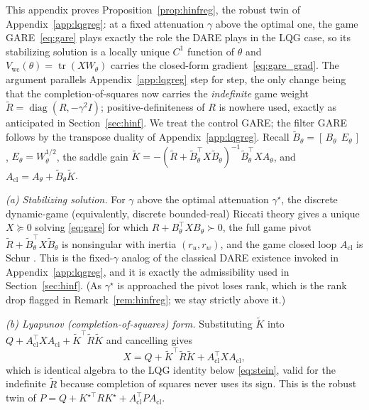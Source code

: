 \documentclass[twocolumn,amsthm]{autart}
\begin{document}
This appendix proves Proposition~\ref{prop:hinfreg}, the robust twin of
Appendix~\ref{app:lqgreg}: at a fixed attenuation $\gamma$ above the optimal
one, the game GARE~\eqref{eq:gare} plays exactly the role the DARE plays in the
LQG case, so its stabilizing solution is a locally unique $C^1$ function of
$\theta$ and $V_{\mathrm{wc}}(\theta)=\operatorname{tr}(XW_\theta)$ carries the
closed-form gradient~\eqref{eq:gare_grad}. The argument parallels
Appendix~\ref{app:lqgreg} step for step, the only change being that the
completion-of-squares now carries the \emph{indefinite} game weight
$\tilde R=\operatorname{diag}(R,-\gamma^2 I)$; positive-definiteness of $R$ is
nowhere used, exactly as anticipated in Section~\ref{sec:hinf}. We treat the
control GARE; the filter GARE follows by the transpose duality of
Appendix~\ref{app:lqgreg}. Recall $\tilde B_\theta=[\,B_\theta\ \ E_\theta\,]$,
$E_\theta=W_\theta^{1/2}$, the saddle gain
$\tilde K=-(\tilde R+\tilde B_\theta^\top X\tilde B_\theta)^{-1}
\tilde B_\theta^\top X A_\theta$, and $A_{\mathrm{cl}}=A_\theta+\tilde B_\theta\tilde K$.

\emph{(a) Stabilizing solution.} For $\gamma$ above the optimal attenuation
$\gamma^\star$, the discrete dynamic-game (equivalently, discrete bounded-real)
Riccati theory gives a unique $X\succeq0$ solving \eqref{eq:gare} for which
$R+B_\theta^\top XB_\theta\succ0$, the full game pivot $\tilde R+\tilde
B_\theta^\top X\tilde B_\theta$ is nonsingular with inertia $(r_u,r_w)$, and the
game closed loop $A_{\mathrm{cl}}$ is Schur \cite{basar1995dynamic,boyd1994linear}.
This is the fixed-$\gamma$ analog of the classical DARE existence invoked in
Appendix~\ref{app:lqgreg}, and it is exactly the admissibility used in
Section~\ref{sec:hinf}. (As $\gamma^\star$ is approached the pivot loses rank,
which is the rank drop flagged in Remark~\ref{rem:hinfreg}; we stay strictly above
it.)

\emph{(b) Lyapunov (completion-of-squares) form.} Substituting
$\tilde K$ into $Q+A_{\mathrm{cl}}^\top XA_{\mathrm{cl}}+\tilde K^\top\tilde
R\tilde K$ and cancelling gives
\begin{equation}\label{eq:gare-lyap}
X=Q+\tilde K^\top\tilde R\tilde K+A_{\mathrm{cl}}^\top XA_{\mathrm{cl}},
\end{equation}
which is identical algebra to the LQG identity below \eqref{eq:stein}, valid for
the indefinite $\tilde R$ because completion of squares never uses its sign. This
is the robust twin of $P=Q+K^{\star\top}RK^\star+A_{\mathrm{cl}}^\top
PA_{\mathrm{cl}}$.
\end{document}
